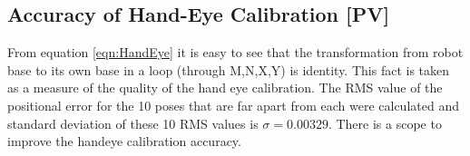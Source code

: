 \subsection{Accuracy of Hand-Eye Calibration [PV]}

From equation \eqref{eqn:HandEye} it is easy to see that the transformation from robot base to its own base in a loop (through M,N,X,Y) is identity. This fact is taken as a measure of the quality of the hand eye calibration. The RMS value of the positional error for the 10 poses that are far apart from each were calculated and standard deviation of these 10 RMS values is $\sigma = 0.00329$. There is a scope to improve the handeye calibration accuracy.  


